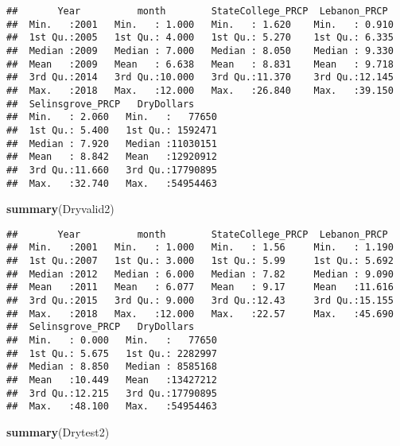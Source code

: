 \documentclass[]{article}
\newenvironment{Shaded}{\begin{snugshade}}{\end{snugshade}}
\newcommand{\KeywordTok}[1]{\textcolor[rgb]{0.13,0.29,0.53}{\textbf{{#1}}}}
\newcommand{\NormalTok}[1]{{#1}}
\begin{document}
\begin{verbatim}
##       Year          month        StateCollege_PRCP  Lebanon_PRCP   
##  Min.   :2001   Min.   : 1.000   Min.   : 1.620    Min.   : 0.910  
##  1st Qu.:2005   1st Qu.: 4.000   1st Qu.: 5.270    1st Qu.: 6.335  
##  Median :2009   Median : 7.000   Median : 8.050    Median : 9.330  
##  Mean   :2009   Mean   : 6.638   Mean   : 8.831    Mean   : 9.718  
##  3rd Qu.:2014   3rd Qu.:10.000   3rd Qu.:11.370    3rd Qu.:12.145  
##  Max.   :2018   Max.   :12.000   Max.   :26.840    Max.   :39.150  
##  Selinsgrove_PRCP   DryDollars      
##  Min.   : 2.060   Min.   :   77650  
##  1st Qu.: 5.400   1st Qu.: 1592471  
##  Median : 7.920   Median :11030151  
##  Mean   : 8.842   Mean   :12920912  
##  3rd Qu.:11.660   3rd Qu.:17790895  
##  Max.   :32.740   Max.   :54954463
\end{verbatim}

\begin{Shaded}
\begin{Highlighting}[]
\KeywordTok{summary}\NormalTok{(Dryvalid2)}
\end{Highlighting}
\end{Shaded}

\begin{verbatim}
##       Year          month        StateCollege_PRCP  Lebanon_PRCP   
##  Min.   :2001   Min.   : 1.000   Min.   : 1.56     Min.   : 1.190  
##  1st Qu.:2007   1st Qu.: 3.000   1st Qu.: 5.99     1st Qu.: 5.692  
##  Median :2012   Median : 6.000   Median : 7.82     Median : 9.090  
##  Mean   :2011   Mean   : 6.077   Mean   : 9.17     Mean   :11.616  
##  3rd Qu.:2015   3rd Qu.: 9.000   3rd Qu.:12.43     3rd Qu.:15.155  
##  Max.   :2018   Max.   :12.000   Max.   :22.57     Max.   :45.690  
##  Selinsgrove_PRCP   DryDollars      
##  Min.   : 0.000   Min.   :   77650  
##  1st Qu.: 5.675   1st Qu.: 2282997  
##  Median : 8.850   Median : 8585168  
##  Mean   :10.449   Mean   :13427212  
##  3rd Qu.:12.215   3rd Qu.:17790895  
##  Max.   :48.100   Max.   :54954463
\end{verbatim}

\begin{Shaded}
\begin{Highlighting}[]
\KeywordTok{summary}\NormalTok{(Drytest2)}
\end{Highlighting}
\end{Shaded}
\end{document}
